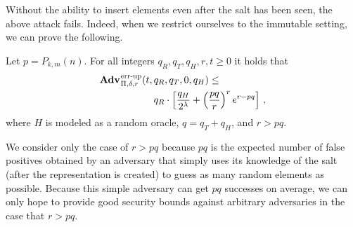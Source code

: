 Without the ability to insert elements even after the salt has been seen, the
above attack fails. Indeed, when we restrict ourselves to the immutable setting,
we can prove the following.
%
\begin{theorem}\label{thm:sbf-errep-immutable}
  Let $p=P_{k,m}(n)$.  For all integers $q_R, q_T, q_H, r, t \geq 0$ it holds
  that
  \begin{equation*}
    \begin{aligned}
            \Adv{\errep}_{\Pi,\delta,r}(t,\,&q_R,q_T,0,q_H) \leq \\
        & q_R \cdot \left[\frac{q_H}{2^\lambda} +
        \left(\frac{pq}{r}\right)^re^{r-pq}\right] \,,
    \end{aligned}
  \end{equation*}
  where $H$ is modeled as a random oracle, $q = q_T + q_H$, and
  $r > pq$.
\end{theorem}
We consider only the case of $r > pq$ because $pq$ is the expected number of
false positives obtained by an adversary that simply uses its knowledge of the
salt (after the representation is created) to guess as many random elements as
possible. Because this simple adversary can get $pq$ successes on average, we
can only hope to provide good security bounds against arbitrary adversaries in
the case that $r > pq$.


